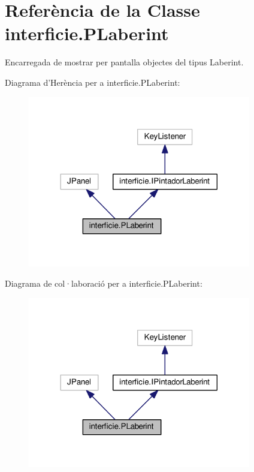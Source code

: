 \hypertarget{classinterficie_1_1_p_laberint}{\section{Referència de la Classe interficie.\+P\+Laberint}
\label{classinterficie_1_1_p_laberint}
}


Encarregada de mostrar per pantalla objectes del tipus Laberint.  




Diagrama d'Herència per a interficie.\+P\+Laberint\+:\nopagebreak
\begin{figure}[H]
\begin{center}
\leavevmode
\includegraphics[width=276pt]{classinterficie_1_1_p_laberint__inherit__graph}
\end{center}
\end{figure}


Diagrama de col·laboració per a interficie.\+P\+Laberint\+:\nopagebreak
\begin{figure}[H]
\begin{center}
\leavevmode
\includegraphics[width=276pt]{classinterficie_1_1_p_laberint__coll__graph}
\end{center}
\end{figure}
